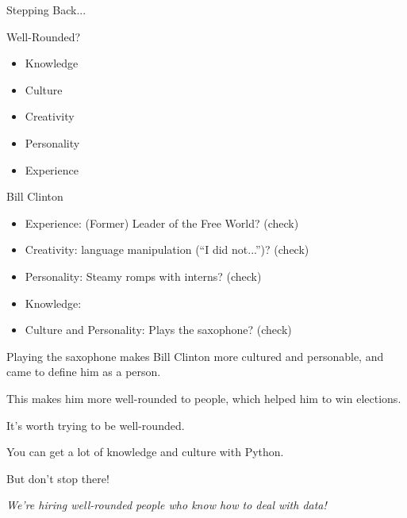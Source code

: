\documentclass{beamer}
\begin{document}
\begin{frame}{Stepping Back...}

Well-Rounded?
\begin{itemize}
  \item Knowledge
  \item Culture
  \item Creativity
  \item Personality
  \item Experience
\end{itemize}

\end{frame}

\begin{frame}{Bill Clinton}

\begin{itemize}
  \item Experience: (Former) Leader of the Free World? (check)
  \item Creativity: language manipulation (``I did not...'')? (check)
  \item Personality: Steamy romps with interns? (check)
  \item Knowledge: 
  \item \alert{Culture and Personality}: Plays the saxophone? (check)
\end{itemize}

Playing the saxophone makes Bill Clinton more cultured and personable, and came to define him as a person.

This makes him more well-rounded to people, which helped him to win elections.

\end{frame}

\begin{frame}

It's worth trying to be well-rounded.

You can get a lot of knowledge and culture with Python.

But don't stop there!

\vskip 1cm
\textit{We're hiring well-rounded people who know how to deal with data!}

\end{frame}
\end{document}
